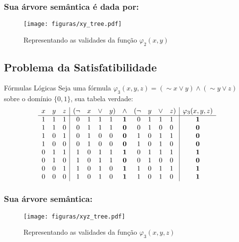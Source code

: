 \documentclass{beamer}
\begin{document}
\begin{frame}
\frametitle{Sua árvore semântica é dada por:}

\begin{figure}[ht!]
 \centering
 \texttt{[image: figuras/xy\_tree.pdf]}
 \caption{Representando as validades da função $\varphi_2 (x,y)$} 
\end{figure}

\end{frame}


\subsection{Problema da Satisfatibilidade}
\begin{frame}[fragile]

\begin{block}{Fórmulas Lógicas}
Seja uma fórmula $\varphi_3 (x,y,z) = (\sim x \vee y)\wedge (\sim y \vee z)$  sobre  o domínio $\{0 , 1\}$, sua  tabela verdade:
$$
\begin{array}{ccc|c@{}cccc@{}ccc@{}cccc@{}c  | c }
x&y&z&(&\lnot&x&\lor&y&)&\land&(&\lnot&y&\lor&z&) & \varphi_3 (x,y,z) \\\hline
1&1&1&&0&1&1&1&&\mathbf{1}&&0&1&1&1& & \mathbf{1}\\
1&1&0&&0&1&1&1&&\mathbf{0}&&0&1&0&0& & \mathbf{0}\\
1&0&1&&0&1&0&0&&\mathbf{0}&&1&0&1&1& & \mathbf{0}\\
1&0&0&&0&1&0&0&&\mathbf{0}&&1&0&1&0& & \mathbf{0}\\
0&1&1&&1&0&1&1&&\mathbf{1}&&0&1&1&1& & \mathbf{1}\\
0&1&0&&1&0&1&1&&\mathbf{0}&&0&1&0&0& & \mathbf{0}\\
0&0&1&&1&0&1&0&&\mathbf{1}&&1&0&1&1& & \mathbf{1}\\
0&0&0&&1&0&1&0&&\mathbf{1}&&1&0&1&0& & \mathbf{1}
\end{array}
$$


\end{block}
\end{frame}

\begin{frame}[fragile]
\frametitle{Sua árvore semântica:}

\begin{figure}[ht!]
 \centering
 \texttt{[image: figuras/xyz\_tree.pdf]}
 \caption{Representando as validades da função $\varphi_3 (x,y,z)$} 
\end{figure}

\end{frame}
\end{document}

